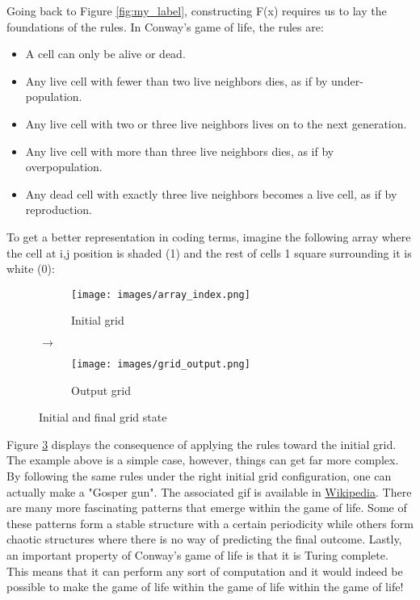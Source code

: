 \pagebreak
Going back to Figure \ref{fig:my_label}, constructing F(x) requires us to lay the foundations of the rules. In Conway's game of life, the rules are: 
\begin{itemize}
    \item A cell can only be alive or dead.
    \item Any live cell with fewer than two live neighbors dies, as if by under-population.
    \item Any live cell with two or three live neighbors lives on to the next generation.
    \item Any live cell with more than three live neighbors dies, as if by overpopulation.
    \item Any dead cell with exactly three live neighbors becomes a live cell, as if by reproduction.
\end{itemize}

To get a better representation in coding terms, imagine the following array where the cell at i,j position is shaded (1) and the rest of cells 1 square surrounding it is white (0): 
\begin{figure}[H]
     \centering
     \begin{subfigure}[h]{0.3\textwidth}
         \centering
         \texttt{[image: images/array\_index.png]}
         \caption{Initial grid}
         \label{fig:input}
     \end{subfigure}
      \hspace{0.7cm}
      $\longrightarrow$
     \begin{subfigure}[h]{0.3\textwidth}
         \centering
         \texttt{[image: images/grid\_output.png]}
         \caption{Output grid}
         \label{fig:output}
     \end{subfigure}
        \caption{Initial and final grid state}
        \label{fig:output_machine}
\end{figure}
Figure \ref{fig:output_machine} displays the consequence of applying the rules toward the initial grid. The example above is a simple case, however, things can get far more complex. By following the same rules under the right initial grid configuration, one can actually make a "Gosper gun". The associated gif is available in \href{https://commons.wikimedia.org/wiki/File:Gospers_glider_gun.gif}{Wikipedia}. There are many more fascinating patterns that emerge within the game of life. Some of these patterns form a stable structure with a certain periodicity while others form chaotic structures where there is no way of predicting the final outcome. Lastly, an important property of Conway's game of life is that it is Turing complete. This means that it can perform any sort of computation and it would indeed be possible to make the game of life within the game of life within the game of life! 
\pagebreak

